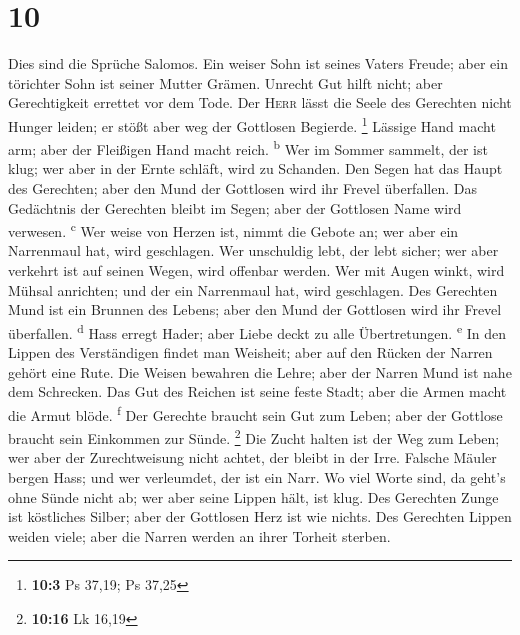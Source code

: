 \hypertarget{section-9}{%
\section{10}\label{section-9}}

 Dies sind die Sprüche Salomos. Ein weiser Sohn ist seines
Vaters Freude; aber ein törichter Sohn ist seiner Mutter Grämen.
 Unrecht Gut hilft nicht; aber Gerechtigkeit errettet vor
dem Tode.  Der \textsc{Herr} lässt die Seele des Gerechten
nicht Hunger leiden; er stößt aber weg der Gottlosen Begierde.
\footnote{\textbf{10:3} Ps 37,19; Ps 37,25}  Lässige Hand
macht arm; aber der Fleißigen Hand macht reich. \textsuperscript{b}
 Wer im Sommer sammelt, der ist klug; wer aber in der
Ernte schläft, wird zu Schanden.  Den Segen hat das Haupt
des Gerechten; aber den Mund der Gottlosen wird ihr Frevel überfallen.
 Das Gedächtnis der Gerechten bleibt im Segen; aber der
Gottlosen Name wird verwesen. \textsuperscript{c}  Wer
weise von Herzen ist, nimmt die Gebote an; wer aber ein Narrenmaul hat,
wird geschlagen.  Wer unschuldig lebt, der lebt sicher;
wer aber verkehrt ist auf seinen Wegen, wird offenbar werden.
 Wer mit Augen winkt, wird Mühsal anrichten; und der ein
Narrenmaul hat, wird geschlagen.  Des Gerechten Mund ist
ein Brunnen des Lebens; aber den Mund der Gottlosen wird ihr Frevel
überfallen. \textsuperscript{d}  Hass erregt Hader; aber
Liebe deckt zu alle Übertretungen. \textsuperscript{e} 
In den Lippen des Verständigen findet man Weisheit; aber auf den Rücken
der Narren gehört eine Rute.  Die Weisen bewahren die
Lehre; aber der Narren Mund ist nahe dem Schrecken.  Das
Gut des Reichen ist seine feste Stadt; aber die Armen macht die Armut
blöde. \textsuperscript{f}  Der Gerechte braucht sein Gut
zum Leben; aber der Gottlose braucht sein Einkommen zur Sünde.
\footnote{\textbf{10:16} Lk 16,19}  Die Zucht halten ist
der Weg zum Leben; wer aber der Zurechtweisung nicht achtet, der bleibt
in der Irre.  Falsche Mäuler bergen Hass; und wer
verleumdet, der ist ein Narr.  Wo viel Worte sind, da
geht's ohne Sünde nicht ab; wer aber seine Lippen hält, ist klug.
 Des Gerechten Zunge ist köstliches Silber; aber der
Gottlosen Herz ist wie nichts.  Des Gerechten Lippen
weiden viele; aber die Narren werden an ihrer Torheit sterben.
